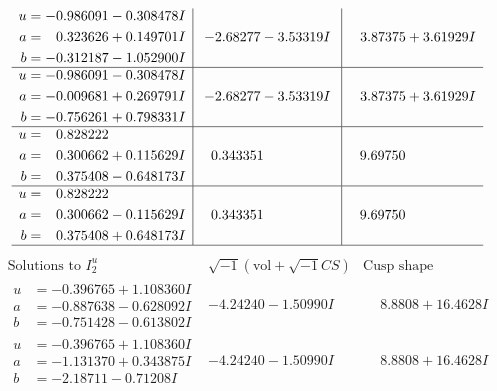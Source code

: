 \documentclass[1p]{elsarticle_modified}
\theoremstyle{definition}
\newcommand{\I}{\sqrt{-1}}
\begin{document}
$$\begin{array}{c|c|c}
\begin{aligned}
u &= -0.986091 - 0.308478 I \\
a &= \phantom{-}0.323626 + 0.149701 I \\
b &= -0.312187 - 1.052900 I\end{aligned}
 & -2.68277 - 3.53319 I & \phantom{-}3.87375 + 3.61929 I \\ \hline\begin{aligned}
u &= -0.986091 - 0.308478 I \\
a &= -0.009681 + 0.269791 I \\
b &= -0.756261 + 0.798331 I\end{aligned}
 & -2.68277 - 3.53319 I & \phantom{-}3.87375 + 3.61929 I \\ \hline\begin{aligned}
u &= \phantom{-}0.828222\phantom{ +0.000000I} \\
a &= \phantom{-}0.300662 + 0.115629 I \\
b &= \phantom{-}0.375408 - 0.648173 I\end{aligned}
 & \phantom{-}0.343351\phantom{ +0.000000I} & \phantom{-}9.69750\phantom{ +0.000000I} \\ \hline\begin{aligned}
u &= \phantom{-}0.828222\phantom{ +0.000000I} \\
a &= \phantom{-}0.300662 - 0.115629 I \\
b &= \phantom{-}0.375408 + 0.648173 I\end{aligned}
 & \phantom{-}0.343351\phantom{ +0.000000I} & \phantom{-}9.69750\phantom{ +0.000000I}\\
 \hline 
 \end{array}$$\newpage$$\begin{array}{c|c|c}  
\text{Solutions to }I^u_{2}& \I (\text{vol} + \sqrt{-1}CS) & \text{Cusp shape}\\
 \hline 
\begin{aligned}
u &= -0.396765 + 1.108360 I \\
a &= -0.887638 - 0.628092 I \\
b &= -0.751428 - 0.613802 I\end{aligned}
 & -4.24240 - 1.50990 I & \phantom{-}8.8808 + 16.4628 I \\ \hline\begin{aligned}
u &= -0.396765 + 1.108360 I \\
a &= -1.131370 + 0.343875 I \\
b &= -2.18711 - 0.71208 I\end{aligned}
 & -4.24240 - 1.50990 I & \phantom{-}8.8808 + 16.4628 I \\ \hline\begin{aligned}

\end{aligned}
\end{array}$$
\end{document}
